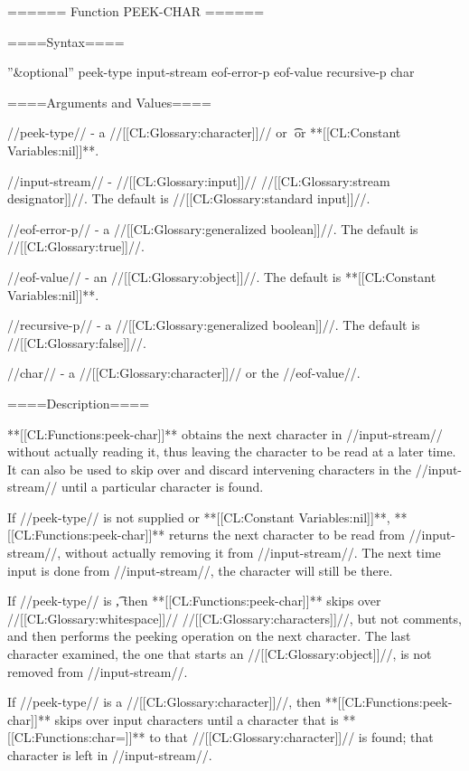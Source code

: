 ====== Function PEEK-CHAR ======

====Syntax====

 {''&optional'' peek-type input-stream eof-error-p eof-value recursive-p} {char}

====Arguments and Values====

//peek-type// - a //[[CL:Glossary:character]]// or \t\ or **[[CL:Constant Variables:nil]]**.

//input-stream// - //[[CL:Glossary:input]]// //[[CL:Glossary:stream designator]]//. The default is //[[CL:Glossary:standard input]]//.

//eof-error-p// - a //[[CL:Glossary:generalized boolean]]//. The default is //[[CL:Glossary:true]]//.

//eof-value// - an //[[CL:Glossary:object]]//. The default is **[[CL:Constant Variables:nil]]**.

//recursive-p// - a //[[CL:Glossary:generalized boolean]]//. The default is //[[CL:Glossary:false]]//.

//char// - a //[[CL:Glossary:character]]// or the //eof-value//.

====Description====

**[[CL:Functions:peek-char]]** obtains the next character in //input-stream// without actually reading it, thus leaving the character to be read at a later time. It can also be used to skip over and discard intervening characters in the //input-stream// until a particular character is found.

If //peek-type// is not supplied or **[[CL:Constant Variables:nil]]**, **[[CL:Functions:peek-char]]** returns the next character to be read from //input-stream//, without actually removing it from //input-stream//. The next time input is done from //input-stream//, the character will still be there.

If //peek-type// is \t, then **[[CL:Functions:peek-char]]** skips over //[[CL:Glossary:whitespace]]// //[[CL:Glossary:characters]]//, but not comments, and then performs the peeking operation on the next character. The last character examined, the one that starts an //[[CL:Glossary:object]]//, is not removed from //input-stream//.

If //peek-type// is a //[[CL:Glossary:character]]//, then **[[CL:Functions:peek-char]]** skips over input characters until a character that is **[[CL:Functions:char=]]** to that //[[CL:Glossary:character]]// is found; that character is left in //input-stream//.

